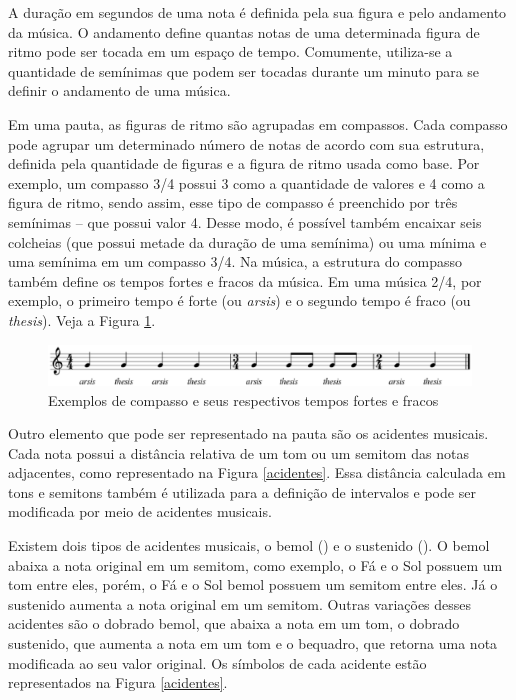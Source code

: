       A duração em segundos de uma nota é definida pela sua figura e pelo andamento da música. O andamento define quantas notas de uma determinada figura de ritmo pode ser tocada em um espaço de tempo. Comumente, utiliza-se a quantidade de semínimas que podem ser tocadas durante um minuto para se definir o andamento de uma música.

      Em uma pauta, as figuras de ritmo são agrupadas em compassos. Cada compasso pode agrupar um determinado número de notas de acordo com sua estrutura, definida pela quantidade de figuras e a figura de ritmo usada como base. Por exemplo, um compasso 3/4 possui 3 como a quantidade de valores e 4 como a figura de ritmo, sendo assim, esse tipo de compasso é preenchido por três semínimas -- que possui valor 4. Desse modo, é possível também encaixar seis colcheias (que possui metade da duração de uma semínima) ou uma mínima e uma semínima em um compasso 3/4. Na música, a estrutura do compasso também define os tempos fortes e fracos da música. Em uma música 2/4, por exemplo, o primeiro tempo é forte (ou \textit{arsis}) e o segundo tempo é fraco (ou \textit{thesis}). Veja a Figura \ref{compassos}.

      \begin{figure}[htb]
        \centering
        \includegraphics[scale=0.6]{figuras/compassos.eps}
        \caption{Exemplos de compasso e seus respectivos tempos fortes e fracos}
        \label{compassos}
      \end{figure}

      Outro elemento que pode ser representado na pauta são os acidentes musicais. Cada nota possui a distância relativa de um tom ou um semitom das notas adjacentes, como representado na Figura \ref{acidentes}. Essa distância calculada em tons e semitons também é utilizada para a definição de intervalos e pode ser modificada por meio de acidentes musicais.

      Existem dois tipos de acidentes musicais, o bemol (\fl) e o sustenido (\sh). O bemol abaixa a nota original em um semitom, como exemplo, o Fá e o Sol possuem um tom entre eles, porém, o Fá e o Sol bemol possuem um semitom entre eles. Já o sustenido aumenta a nota original em um semitom. Outras variações desses acidentes são o dobrado bemol, que abaixa a nota em um tom, o dobrado sustenido, que aumenta a nota em um tom e o bequadro, que retorna uma nota modificada ao seu valor original. Os símbolos de cada acidente estão representados na Figura \ref{acidentes}.

